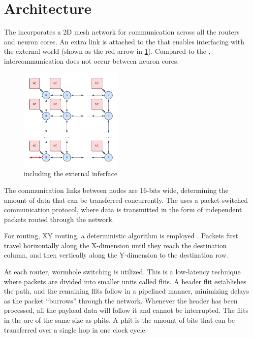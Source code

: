 \section{Architecture}
The \confignoc{} incorporates a 2D mesh network for communication across all the routers and neuron cores.
An extra link is attached to the \confignoc{} that enables interfacing with the external world (shown as the red arrow in \cref{fig:config_noc_ext}).
Compared to the \eventnoc{}, intercommunication does not occur between neuron cores.

\begin{figure}[hbtp]
\centering    
\includegraphics[width=0.45\textwidth]{assets/config_noc_inj.pdf}
\caption{\confignoc{} including the external inferface}
\label{fig:config_noc_ext}
\end{figure}

The communication links between nodes are 16-bits wide, determining the amount of data that can be transferred concurrently.
The \confignoc{} uses a packet-switched communication protocol, where data is transmitted in the form of independent packets routed through the network.

For routing, XY routing, a deterministic algorithm is employed \autocite{glassTurnModelAdaptive1992}.
Packets first travel horizontally along the X-dimension until they reach the destination column, and then vertically along the Y-dimension to the destination row.

At each router, wormhole switching is utilized.
This is a low-latency technique where packets are divided into smaller units called flits.
A header flit establishes the path, and the remaining flits follow in a pipelined manner, minimizing delays as the packet ``burrows'' through the network.
Whenever the header has been processed, all the payload data will follow it and cannot be interrupted.
The flits in the \confignoc{} are of the same size as phits.
A phit is the amount of bits that can be transferred over a single hop in one clock cycle.

